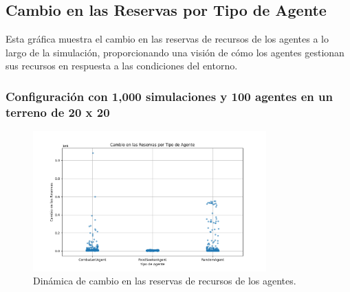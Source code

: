 \documentclass[11pt]{article}
\begin{document}

\subsection{Cambio en las Reservas por Tipo de Agente}
Esta gráfica muestra el cambio en las reservas de recursos de los agentes a lo largo de la simulación, proporcionando una visión de cómo los agentes gestionan sus recursos en respuesta a las condiciones del entorno.

\subsubsection{Configuración con 1,000 simulaciones y 100 agentes en un terreno de 20 x 20}
\begin{figure}[H]
    \centering
    \includegraphics[width=0.8\textwidth]{images/Figure_4.png}
    \caption{Dinámica de cambio en las reservas de recursos de los agentes.}
\end{figure}
\end{document}
